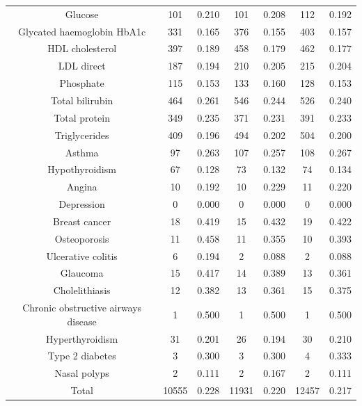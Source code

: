 \begin{table}[h!]
{\begin{tabular}{|c|cc|cc|cc|}
    Glucose & 101 & 0.210 & 101 & 0.208 & 112 & 0.192 \\
    Glycated haemoglobin HbA1c & 331 & 0.165 & 376 & 0.155 & 403 & 0.157 \\
    HDL cholesterol & 397 & 0.189 & 458 & 0.179 & 462 & 0.177 \\
    LDL direct & 187 & 0.194 & 210 & 0.205 & 215 & 0.204 \\
    Phosphate & 115 & 0.153 & 133 & 0.160 & 128 & 0.153 \\
    Total bilirubin & 464 & 0.261 & 546 & 0.244 & 526 & 0.240 \\
    Total protein & 349 & 0.235 & 371 & 0.231 & 391 & 0.233 \\
    Triglycerides & 409 & 0.196 & 494 & 0.202 & 504 & 0.200 \\
    Asthma & 97 &0.263 &107 &0.257 & 108 & 0.267 \\
    Hypothyroidism & 67 &0.128 &73 &0.132 &74 & 0.134 \\
    Angina & 10 &0.192 &10 &0.229 &11 & 0.220 \\
    Depression & 0 &0.000 &0 &0.000 &0 & 0.000 \\
    Breast cancer &18 &0.419 &15 &0.432 &19 & 0.422 \\
    Osteoporosis &11 &0.458 &11 &0.355 &10 & 0.393 \\
    Ulcerative colitis & 6 &0.194 &2 &0.088 &2 & 0.088 \\
    Glaucoma & 15 &0.417 &14 &0.389 &13 & 0.361 \\
    Cholelithiasis &12 &0.382 &13 &0.361 &15 & 0.375 \\
    Chronic obstructive airways disease &1 &0.500 &1 &0.500 &1 & 0.500 \\
    Hyperthyroidism &31 &0.201 &26 &0.194 &30 & 0.210 \\
    Type 2 diabetes &3 &0.300 &3 &0.300 &4 & 0.333 \\
    Nasal polyps &2 &0.111 &2 &0.167 &2 & 0.111 \\
    \hline
    Total & 10555 & 0.228 & 11931 & 0.220 & 12457 & 0.217 \\
    \hline
    \end{tabular}
    }
    \label{tab:repl1}
\end{table}

\clearpage

